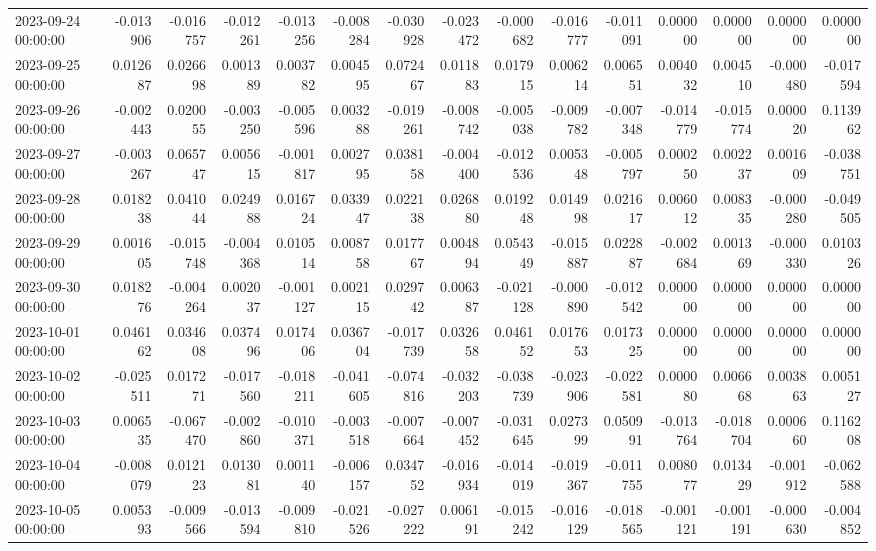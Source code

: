 \begin{tabular}{lrrrrrrrrrrrrrr}
2023-09-24 00:00:00 & -0.013906 & -0.016757 & -0.012261 & -0.013256 & -0.008284 & -0.030928 & -0.023472 & -0.000682 & -0.016777 & -0.011091 & 0.000000 & 0.000000 & 0.000000 & 0.000000 \\
2023-09-25 00:00:00 & 0.012687 & 0.026698 & 0.001389 & 0.003782 & 0.004595 & 0.072467 & 0.011883 & 0.017915 & 0.006214 & 0.006551 & 0.004032 & 0.004510 & -0.000480 & -0.017594 \\
2023-09-26 00:00:00 & -0.002443 & 0.020055 & -0.003250 & -0.005596 & 0.003288 & -0.019261 & -0.008742 & -0.005038 & -0.009782 & -0.007348 & -0.014779 & -0.015774 & 0.000020 & 0.113962 \\
2023-09-27 00:00:00 & -0.003267 & 0.065747 & 0.005615 & -0.001817 & 0.002795 & 0.038158 & -0.004400 & -0.012536 & 0.005348 & -0.005797 & 0.000250 & 0.002237 & 0.001609 & -0.038751 \\
2023-09-28 00:00:00 & 0.018238 & 0.041044 & 0.024988 & 0.016724 & 0.033947 & 0.022138 & 0.026880 & 0.019248 & 0.014998 & 0.021617 & 0.006012 & 0.008335 & -0.000280 & -0.049505 \\
2023-09-29 00:00:00 & 0.001605 & -0.015748 & -0.004368 & 0.010514 & 0.008758 & 0.017767 & 0.004894 & 0.054349 & -0.015887 & 0.022887 & -0.002684 & 0.001369 & -0.000330 & 0.010326 \\
2023-09-30 00:00:00 & 0.018276 & -0.004264 & 0.002037 & -0.001127 & 0.002115 & 0.029742 & 0.006387 & -0.021128 & -0.000890 & -0.012542 & 0.000000 & 0.000000 & 0.000000 & 0.000000 \\
2023-10-01 00:00:00 & 0.046162 & 0.034608 & 0.037496 & 0.017406 & 0.036704 & -0.017739 & 0.032658 & 0.046152 & 0.017653 & 0.017325 & 0.000000 & 0.000000 & 0.000000 & 0.000000 \\
2023-10-02 00:00:00 & -0.025511 & 0.017271 & -0.017560 & -0.018211 & -0.041605 & -0.074816 & -0.032203 & -0.038739 & -0.023906 & -0.022581 & 0.000080 & 0.006668 & 0.003863 & 0.005127 \\
2023-10-03 00:00:00 & 0.006535 & -0.067470 & -0.002860 & -0.010371 & -0.003518 & -0.007664 & -0.007452 & -0.031645 & 0.027399 & 0.050991 & -0.013764 & -0.018704 & 0.000660 & 0.116208 \\
2023-10-04 00:00:00 & -0.008079 & 0.012123 & 0.013081 & 0.001140 & -0.006157 & 0.034752 & -0.016934 & -0.014019 & -0.019367 & -0.011755 & 0.008077 & 0.013429 & -0.001912 & -0.062588 \\
2023-10-05 00:00:00 & 0.005393 & -0.009566 & -0.013594 & -0.009810 & -0.021526 & -0.027222 & 0.006191 & -0.015242 & -0.016129 & -0.018565 & -0.001121 & -0.001191 & -0.000630 & -0.004852 \\

\end{tabular}
